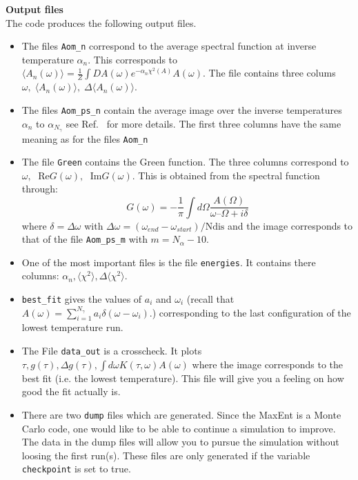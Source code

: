 \noindent
\textbf{Output files} \\
The code produces  the following output files.
\begin{itemize}
\item The files  \texttt{Aom\_n}  correspond to the average spectral function at inverse  temperature  $ \alpha_n $. This corresponds to
$  \langle A_n(\omega) \rangle =   \frac{1}{Z}   \int DA(\omega)    e^{-\alpha_n \chi^{2}(A)  } A(\omega). $
The file contains three colums  $ \omega, \;  \langle A_n(\omega) \rangle , \;  \Delta \langle A_n(\omega) \rangle $.

\item The files \texttt{Aom\_ps\_n}   contain the average image over  the  inverse   temperatures  $ \alpha_n $ to $ \alpha_{N_\gamma} $  see Ref.~\cite{Beach04a} for more details.   
 The first three columns have the same meaning as for the files \texttt{Aom\_n}

\item The file \texttt{Green} contains the Green function. The three columns correspond to $ \omega, \;   \text{ Re} G(\omega), \;  \text{  Im} G(\omega)  $.  This is obtained from the spectral function through:
\begin{equation}
 G(\omega) =  -\frac{1}{\pi} \int d \Omega   \frac{A(\Omega)}{\omega – \Omega + i \delta}
 \end{equation}
where  $ \delta =  \Delta \omega$ with $ \Delta \omega = (\omega_{end} -  \omega_{start})/\text{Ndis}$ and the image corresponds to that of the file \texttt{Aom\_ps\_m} with $ m = N_{\alpha} -10 $.

\item  One of the most important files is the file  \texttt{energies}. It contains there columns:  $ \alpha_n, \langle \chi^2 \rangle, \Delta \langle \chi^2 \rangle $.

\item   \texttt{best\_fit}  gives the values of $a_i$ and $\omega_i$   (recall that $ A(\omega)  = \sum_{i=1}^{N_{\gamma}} a_{i} \delta \left( \omega - \omega_i \right).$) corresponding to the last configuration of the  lowest temperature run.

\item  The File \texttt{data\_out}  is a crosscheck. It plots   $ \tau,  g(\tau),  \Delta g(\tau), \int d \omega  K(\tau, \omega) A(\omega) $ where the image  corresponds to the best fit (i.e. the lowest temperature). 
This file will give you  a feeling on how good the fit actually is.


\item There are two \texttt{dump} files which are generated. Since  the MaxEnt is a  Monte Carlo code, one  would like to be able to continue a simulation to improve. The data in the dump files will allow you to pursue the simulation without loosing the first run(s).   These files are  only generated if the variable  \texttt{checkpoint} is set to true. 
 \end{itemize}

